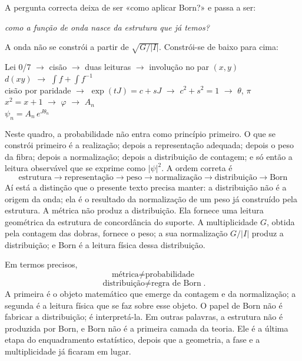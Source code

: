 \documentclass[11pt,a4paper]{article}
\begin{document}
A pergunta correcta deixa de ser «como aplicar Born?» e passa a ser:

\begin{center}
\textit{como a função de onda nasce da estrutura que já temos?}
\end{center}

A onda não se constrói a partir de $\sqrt{G/|I|}$. Constrói-se de baixo para cima:

\begin{center}
Lei 0/7 $\to$ cisão $\to$ duas leituras $\to$ involução no par $(x,y)$\\[2pt]
$d(xy)$ $\to$ $\int f+\int f^{-1}$\\[2pt]
cisão por paridade $\to$ $\exp(tJ)=c+sJ$ $\to$ $c^2+s^2=1$ $\to$ $\theta$, $\pi$\\[2pt]
$x^2=x+1$ $\to$ $\varphi$ $\to$ $A_n$\\[2pt]
$\psi_n=A_n\,e^{J\theta_n}$
\end{center}

Neste quadro, a probabilidade não entra como princípio primeiro. O que se constrói primeiro é a realização; depois a representação adequada; depois o peso da fibra; depois a normalização; depois a distribuição de contagem; e só então a leitura observável que se exprime como $|\psi|^2$. A ordem correta é
\[
\boxed{
\text{estrutura}
\longrightarrow
\text{representação}
\longrightarrow
\text{peso}
\longrightarrow
\text{normalização}
\longrightarrow
\text{distribuição}
\longrightarrow
\text{Born}
}
\]
Aí está a distinção que o presente texto precisa manter: a distribuição não é a origem da onda; ela é o resultado da normalização de um peso já construído pela estrutura. A métrica não produz a distribuição. Ela fornece uma leitura geométrica da estrutura de concordância do suporte. A multiplicidade $G$, obtida pela contagem das dobras, fornece o peso; a sua normalização $G/|I|$ produz a distribuição; e Born é a leitura física dessa distribuição.

Em termos precisos,
\[
\boxed{\text{métrica} \neq \text{probabilidade}}
\]
\[
\boxed{\text{distribuição} \neq \text{regra de Born}}.
\]
A primeira é o objeto matemático que emerge da contagem e da normalização; a segunda é a leitura física que se faz sobre esse objeto. O papel de Born não é fabricar a distribuição; é interpretá-la. Em outras palavras, a estrutura não é produzida por Born, e Born não é a primeira camada da teoria. Ele é a última etapa do enquadramento estatístico, depois que a geometria, a fase e a multiplicidade já ficaram em lugar.
\end{document}
